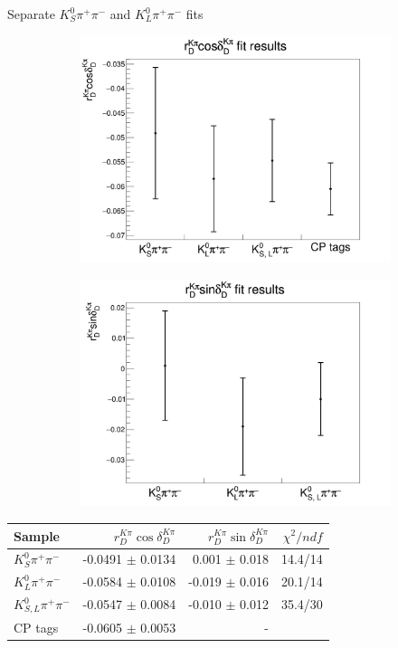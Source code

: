 \documentclass{beamer}
\begin{document}
\begin{frame}{Separate $K_S^0\pi^+\pi^-$ and $K_L^0\pi^+\pi^-$ fits}
  \begin{figure}
    \centering
    \begin{subfigure}{0.5\textwidth}
      \centering
      \includegraphics[width=\textwidth]{rDcosDeltaK0pipi.png}
    \end{subfigure}%
    \begin{subfigure}{0.5\textwidth}
      \centering
      \includegraphics[width=\textwidth]{rDsinDeltaK0pipi.png}
    \end{subfigure}
  \end{figure}
  \centering
  \begin{tabular}{lrrr}
    \hline
    Sample                 & $r_D^{K\pi}\cos\delta_D^{K\pi}$ & $r_D^{K\pi}\sin\delta_D^{K\pi}$ & $\chi^2/{ndf}$ \\
    \hline
    $K^0_S \pi^+\pi^-$     & -0.0491 $\pm$ 0.0134 &  0.001 $\pm$ 0.018 & 14.4/14 \\
    $K^0_L \pi^+\pi^-$     & -0.0584 $\pm$ 0.0108 & -0.019 $\pm$ 0.016 & 20.1/14 \\
    $K^0_{S,L} \pi^+\pi^-$ & -0.0547 $\pm$ 0.0084 & -0.010 $\pm$ 0.012 & 35.4/30 \\
    CP tags                & -0.0605 $\pm$ 0.0053 & - & \\
    \hline
  \end{tabular}
\end{frame}
\end{document}
